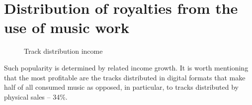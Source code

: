 \documentclass[12pt]{report}
\begin{document}
\vfill\null\pagebreak
\section{Distribution of royalties from the use of music work}
\label{industry-distribution}

\newcommand{\slice}[4]{
  \pgfmathparse{0.5*#1+0.5*#2}
  \let\midangle\pgfmathresult

  \draw[thick,fill=black!10] (0,0) -- (#1:1) arc (#1:#2:1) -- cycle;

  \node[label=\midangle:#4] at (\midangle:1) {};

  \pgfmathparse{min((#2-#1-10)/110*(-0.3),0)}
  \let\temp\pgfmathresult
  \pgfmathparse{max(\temp,-0.5) + 0.8}
  \let\innerpos\pgfmathresult
  \node at (\midangle:\innerpos) {#3};
}

\def\Royalty{Copyright}
\def\Digital{Digital formats}
\def\Physical{Physical media}
\def\Sync{Synchronization}

\begin{figure}[H]
\centering
\caption{Track distribution income}
\end{figure}

Such popularity is determined by related income growth. It is worth mentioning that the most profitable are the tracks distributed in digital formats that make half of all consumed music as opposed, in particular, to tracks distributed by physical sales – 34\%.
\end{document}
